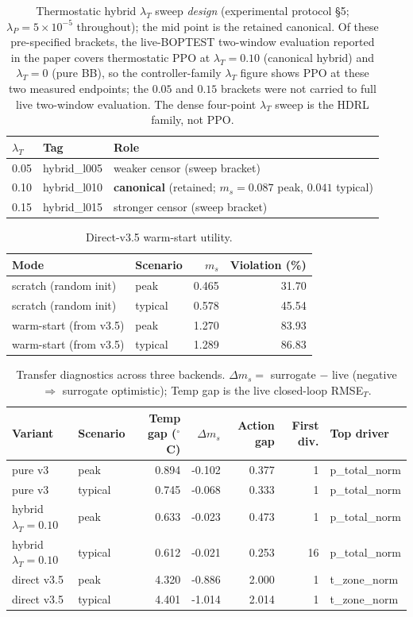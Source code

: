 \documentclass[11pt,a4paper]{article}
\begin{document}
\begin{table}[H]
\centering
\caption{Thermostatic hybrid $\lambda_T$ sweep \emph{design} (experimental protocol \S5; $\lambda_P=5\times10^{-5}$ throughout); the mid point is the retained canonical. Of these pre-specified brackets, the live-BOPTEST two-window evaluation reported in the paper covers thermostatic PPO at $\lambda_T=0.10$ (canonical hybrid) and $\lambda_T=0$ (pure BB), so the controller-family $\lambda_T$ figure shows PPO at these two measured endpoints; the $0.05$ and $0.15$ brackets were not carried to full live two-window evaluation. The dense four-point $\lambda_T$ sweep is the HDRL family, not PPO.}
\label{tab:hybrid_sweep}
\small
\begin{tabular}{lll}
\toprule
$\lambda_T$ & Tag & Role \\
\midrule
0.05 & hybrid\_l005 & weaker censor (sweep bracket) \\
0.10 & hybrid\_l010 & \textbf{canonical} (retained; $m_s=0.087$ peak, $0.041$ typical) \\
0.15 & hybrid\_l015 & stronger censor (sweep bracket) \\
\bottomrule
\end{tabular}
\end{table}
\begin{table}[H]
\centering
\caption{Direct-v3.5 warm-start utility.}
\label{tab:warmstart}
\small
\begin{tabular}{llrr}
\toprule
Mode & Scenario & $m_s$ & Violation (\%) \\
\midrule
scratch (random init) & peak & 0.465 & 31.70 \\
scratch (random init) & typical & 0.578 & 45.54 \\
warm-start (from v3.5) & peak & 1.270 & 83.93 \\
warm-start (from v3.5) & typical & 1.289 & 86.83 \\
\bottomrule
\end{tabular}
\end{table}
\begin{table}[H]
\centering
\caption{Transfer diagnostics across three backends. $\Delta m_s=$ surrogate $-$ live (negative $\Rightarrow$ surrogate optimistic); Temp gap is the live closed-loop RMSE$_T$.}
\label{tab:transfer}
\small
\begin{tabular}{llrrrrl}
\toprule
Variant & Scenario & Temp gap ($^\circ$C) & $\Delta m_s$ & Action gap & First div. & Top driver \\
\midrule
pure v3 & peak & 0.894 & -0.102 & 0.377 & 1 & p\_total\_norm \\
pure v3 & typical & 0.745 & -0.068 & 0.333 & 1 & p\_total\_norm \\
hybrid $\lambda_T=0.10$ & peak & 0.633 & -0.023 & 0.473 & 1 & p\_total\_norm \\
hybrid $\lambda_T=0.10$ & typical & 0.612 & -0.021 & 0.253 & 16 & p\_total\_norm \\
direct v3.5 & peak & 4.320 & -0.886 & 2.000 & 1 & t\_zone\_norm \\
direct v3.5 & typical & 4.401 & -1.014 & 2.014 & 1 & t\_zone\_norm \\
\bottomrule
\end{tabular}
\end{table}
\end{document}
